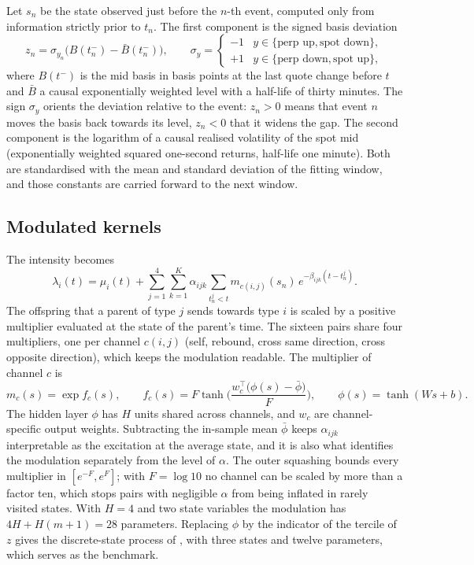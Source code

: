 \documentclass[a4paper,11pt]{article}
\begin{document}
Let $s_n$ be the state observed just before the $n$-th event, computed only from information strictly prior to $t_n$. The first component is the signed basis deviation
\begin{equation}
z_n = \sigma_{y_n}\big(B(t_n^-) - \bar B(t_n^-)\big), \qquad
\sigma_y = \begin{cases} -1 & y \in \{\text{perp up}, \text{spot down}\},\\ +1 & y \in \{\text{perp down}, \text{spot up}\}, \end{cases}
\end{equation}
where $B(t^-)$ is the mid basis in basis points at the last quote change before $t$ and $\bar B$ a causal exponentially weighted level with a half-life of thirty minutes. The sign $\sigma_y$ orients the deviation relative to the event: $z_n > 0$ means that event $n$ moves the basis back towards its level, $z_n < 0$ that it widens the gap. The second component is the logarithm of a causal realised volatility of the spot mid (exponentially weighted squared one-second returns, half-life one minute). Both are standardised with the mean and standard deviation of the fitting window, and those constants are carried forward to the next window.

\subsection{Modulated kernels}

The intensity becomes
\begin{equation}\label{eq:sd}
\lambda_i(t) = \mu_i(t) + \sum_{j=1}^{4} \sum_{k=1}^{K} \alpha_{ijk} \sum_{t^j_n < t} m_{c(i,j)}(s_n)\, e^{-\beta_{ijk}(t - t^j_n)} .
\end{equation}
The offspring that a parent of type $j$ sends towards type $i$ is scaled by a positive multiplier evaluated at the state of the parent's time. The sixteen pairs share four multipliers, one per channel $c(i,j)$ (self, rebound, cross same direction, cross opposite direction), which keeps the modulation readable. The multiplier of channel $c$ is
\begin{equation}\label{eq:mod}
m_c(s) = \exp f_c(s), \qquad f_c(s) = F \tanh\!\Big(\frac{w_c^\top\big(\phi(s) - \bar\phi\big)}{F}\Big), \qquad \phi(s) = \tanh(W s + b).
\end{equation}
The hidden layer $\phi$ has $H$ units shared across channels, and $w_c$ are channel-specific output weights. Subtracting the in-sample mean $\bar\phi$ keeps $\alpha_{ijk}$ interpretable as the excitation at the average state, and it is also what identifies the modulation separately from the level of $\alpha$. The outer squashing bounds every multiplier in $[e^{-F}, e^{F}]$; with $F = \log 10$ no channel can be scaled by more than a factor ten, which stops pairs with negligible $\alpha$ from being inflated in rarely visited states. With $H = 4$ and two state variables the modulation has $4H + H(m+1) = 28$ parameters. Replacing $\phi$ by the indicator of the tercile of $z$ gives the discrete-state process of \cite{morariupatrichi2022}, with three states and twelve parameters, which serves as the benchmark.
\end{document}
